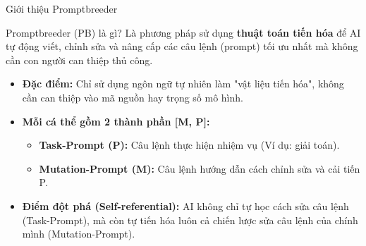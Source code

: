 \documentclass[english,main=vietnamese,xcolor=table]{beamer}
\begin{document}
\begin{frame}{Giới thiệu Promptbreeder}

    \begin{block}{Promptbreeder (PB) là gì?}
        Là phương pháp sử dụng \textbf{thuật toán tiến hóa} để AI tự động viết, chỉnh sửa và nâng cấp các câu lệnh (prompt) tối ưu nhất mà không cần con người can thiệp thủ công.
    \end{block}

    \vspace{5pt}

    \begin{itemize}
        \setlength{\itemsep}{6pt}

        \item \textbf{Đặc điểm:} Chỉ sử dụng ngôn ngữ tự nhiên làm "vật liệu tiến hóa", không cần can thiệp vào mã nguồn hay trọng số mô hình.

        \item \textbf{Mỗi cá thể gồm 2 thành phần [M, P]:}
        \begin{itemize}
            \item \textbf{Task-Prompt (P):} Câu lệnh thực hiện nhiệm vụ (Ví dụ: giải toán).
            \item \textbf{Mutation-Prompt (M):} Câu lệnh hướng dẫn cách chỉnh sửa và cải tiến P.
        \end{itemize}

        \item \textbf{Điểm đột phá (Self-referential):} AI không chỉ tự học cách sửa câu lệnh (Task-Prompt), mà còn tự tiến hóa luôn cả chiến lược sửa câu lệnh của chính mình (Mutation-Prompt).

    \end{itemize}

\end{frame}

\end{document}
